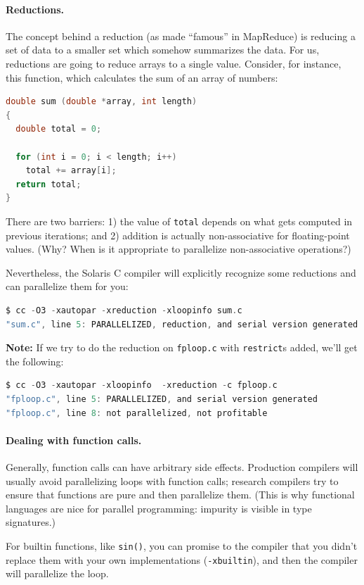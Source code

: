 \documentclass[a4paper]{report}
\begin{document}
\paragraph{Reductions.} The concept behind a 
reduction (as made ``famous'' in MapReduce) is reducing a set of data to a smaller set which somehow
summarizes the data. For us, reductions are going to reduce
arrays to a single value. Consider, for instance, this function, which
calculates the sum of an array of numbers:
{
\begin{lstlisting}[language=C]
double sum (double *array, int length)
{
  double total = 0;

  for (int i = 0; i < length; i++)
    total += array[i];
  return total;
}
\end{lstlisting}
}

There are two barriers: 1) the value of {\tt total} depends on what
gets computed in previous iterations; and 2) addition is actually
non-associative for floating-point values. ({\sf Why? When is it
appropriate to parallelize non-associative operations?})

\newpage
Nevertheless, the Solaris C compiler will explicitly recognize
some reductions and can parallelize them for you:
{
\begin{lstlisting}[language=C]
$ cc -O3 -xautopar -xreduction -xloopinfo sum.c
"sum.c", line 5: PARALLELIZED, reduction, and serial version generated
\end{lstlisting}
}

{\bf Note:}  If we try to do the reduction on {\tt fploop.c} with {\tt restrict}s added, we'll get the following:
\begin{lstlisting}[language=C]
$ cc -O3 -xautopar -xloopinfo  -xreduction -c fploop.c
"fploop.c", line 5: PARALLELIZED, and serial version generated
"fploop.c", line 8: not parallelized, not profitable
\end{lstlisting}

\paragraph{Dealing with function calls.} Generally, function calls
can have arbitrary side effects. Production compilers will usually
avoid parallelizing loops with function calls; research compilers try
to ensure that functions are pure and then parallelize them.
(This is why functional languages are nice for parallel
programming: impurity is visible in type signatures.)

For builtin functions, like {\tt sin()}, you can promise to the 
compiler that you didn't replace them with your own implementations
({\tt -xbuiltin}), and then the compiler will parallelize the loop.
\end{document}
